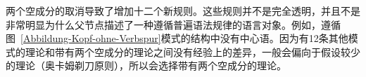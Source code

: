 \zl
\largerpage
两个空成分的取消导致了增加十二个新规则。这些规则并不是完全透明，并且不是非常明显为什么父节点描述了一种遵循普遍语法规律的语言对象。例如，遵循图~\ref{Abbildung-Kopf-ohne-Verbspur}模式的结构中没有中心语。因为有12条其他模式的理论和带有两个空成分的理论之间没有经验上的差异，一般会偏向于假设较少的理论（奥卡姆剃刀原则），所以会选择带有两个空成分的理论。

